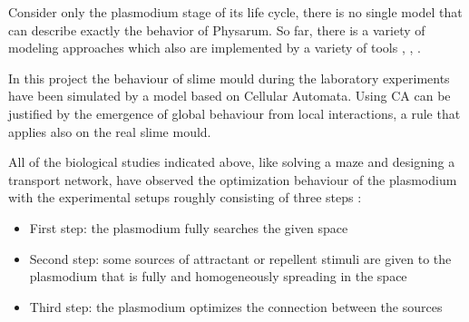 Consider only the plasmodium stage of its life cycle, there is no single model that can describe exactly the behavior of Physarum. So far, there is a variety of modeling approaches which also are implemented by a variety of tools \cite{Tsompanas2016}, \cite{gunji2008minimal}, \cite{shirakawa2015construction}.
\par
In this project the behaviour of slime mould during the laboratory experiments have been simulated by a model based on Cellular Automata. Using CA can be justified by the emergence of global behaviour from local interactions, a rule that applies also on the real slime mould.
\par
All of the biological studies indicated above, like solving a maze and designing a transport network, have observed the optimization behaviour of the plasmodium with the experimental setups roughly consisting of three steps \cite{shirakawa2015construction}:
\begin{itemize}
	\item First step: the plasmodium fully searches the given space
	\item Second step: some sources of attractant or repellent stimuli are given to the plasmodium that is fully and homogeneously spreading in the space
	\item Third step: the plasmodium optimizes the connection between the sources
\end{itemize}

